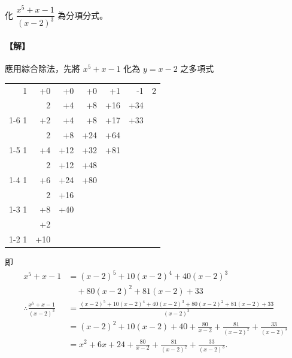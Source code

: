 \begin{example}\label{ex:7-3-8}
化 $\dfrac{x^5+x-1}{(x-2)^3}$ 為分項分式。

\paragraph{【解】}
應用綜合除法，先將 $x^5+x-1$ 化為 $y=x-2$ 之多項式
\begin{center}
\renewcommand{\arraystretch}{1.2}
\begin{tabular}{rrrrrr|l}
1 & +0 & +0 & +0 & +1 & -1 & 2 \\
  & 2  & +4 & +8 & +16 & +34 & \\ \cline{1-6}
1 & +2 & +4 & +8 & +17 & \multicolumn{1}{|r}{+33} & \\
  & 2  & +8 & +24 & +64 & \multicolumn{1}{|l}{} \\ \cline{1-5}
1 & +4 & +12 & +32 & \multicolumn{1}{|r}{+81} & \multicolumn{1}{|l}{} \\
  & 2  & +12 & +48 & \multicolumn{2}{|l}{} \\ \cline{1-4}
1 & +6 & +24 & \multicolumn{1}{|r}{+80} & \multicolumn{2}{|l}{} \\
  & 2  & +16 & \multicolumn{3}{|l}{} \\ \cline{1-3}
1 & +8 & \multicolumn{1}{|r}{+40} & \multicolumn{3}{|l}{} \\
  & +2 & \multicolumn{4}{|l}{} \\ \cline{1-2}
1 & \multicolumn{1}{|r}{+10} & \multicolumn{4}{|l}{}
\end{tabular}
\end{center}
即
\begin{align*}
  x^5+x-1 &= (x-2)^5 + 10(x-2)^4 + 40(x-2)^3 \\
  &\quad + 80(x-2)^2 + 81(x-2) + 33 \\
  \therefore \frac{x^5+x-1}{(x-2)^3} &= \frac{(x-2)^5+10(x-2)^4+40(x-2)^3+80(x-2)^2+81(x-2)+33}{(x-2)^3} \\
  &= (x-2)^2 + 10(x-2) + 40 + \frac{80}{x-2} + \frac{81}{(x-2)^2} + \frac{33}{(x-2)^3} \\
  &= x^2+6x+24 + \frac{80}{x-2} + \frac{81}{(x-2)^2} + \frac{33}{(x-2)^3}.
\end{align*}
\end{example}

